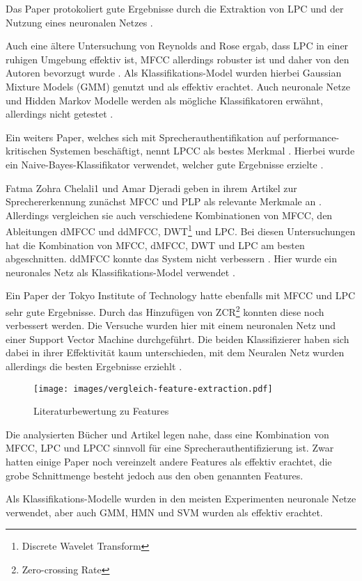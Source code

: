 Das Paper  protokoliert gute Ergebnisse durch die Extraktion von \ac{LPC} und der Nutzung eines neuronalen Netzes \autocite[vgl.][S. 9]{kumar_rajeev_multilingual_2009}.

Auch eine ältere Untersuchung von Reynolds and Rose ergab, dass \ac{LPC} in einer ruhigen Umgebung effektiv ist, \ac{MFCC} allerdings robuster ist und daher von den Autoren bevorzugt wurde \autocite[vgl.][S. 2f]{reynolds_robust_1995}.
Als Klassifikations-Model wurden hierbei Gaussian Mixture Models (GMM) genutzt und als effektiv erachtet.
Auch neuronale Netze und Hidden Markov Modelle werden als mögliche Klassifikatoren erwähnt, allerdings nicht getestet \autocite[vgl.][S. 2f, 11]{reynolds_robust_1995}.

Ein weiters Paper, welches sich mit Sprecherauthentifikation auf performance-kritischen Systemen beschäftigt, nennt \ac{LPCC} als bestes Merkmal \autocite[vgl.][S. 7]{thullier_text-independent_2017}.
Hierbei wurde ein Naive-Bayes-Klassifikator verwendet, welcher gute Ergebnisse erzielte \autocite[vgl.][S. 18f]{thullier_text-independent_2017}.

Fatma Zohra Chelali1 und Amar Djeradi geben in ihrem Artikel zur Sprechererkennung zunächst \ac{MFCC} und PLP als relevante Merkmale an \autocite[vgl.][S. 276]{chelali_text_2017}.
Allerdings vergleichen sie auch verschiedene Kombinationen von \ac{MFCC}, den Ableitungen \ac{dMFCC} und \ac{ddMFCC}, DWT\footnote{Discrete Wavelet Transform} und \ac{LPC}.
Bei diesen Untersuchungen hat die Kombination von \ac{MFCC}, \ac{dMFCC}, DWT und \ac{LPC} am besten abgeschnitten.
\ac{ddMFCC} konnte das System nicht verbessern \autocite[vgl.][S. 276, 739]{chelali_text_2017}.
Hier wurde ein neuronales Netz als Klassifikations-Model verwendet \autocite[vgl.][S. 735]{chelali_text_2017}.

Ein Paper der Tokyo Institute of Technology hatte ebenfalls mit \ac{MFCC} und \ac{LPC} sehr gute Ergebnisse.
Durch das Hinzufügen von ZCR\footnote{Zero-crossing Rate} konnten diese noch verbessert werden.
Die Versuche wurden hier mit einem neuronalen Netz und einer Support Vector Machine durchgeführt.
Die beiden Klassifizierer haben sich dabei in ihrer Effektivität kaum unterschieden, mit dem Neuralen Netz wurden allerdings die besten Ergebnisse erziehlt \autocite[vgl.][S. 4]{neha_chauhan_2019_2019}.

\begin{figure}[H]
    \centering
    \texttt{[image: images/vergleich-feature-extraction.pdf]}
    \caption{Literaturbewertung zu Features}
    \label{fig:vergleichFeatureExtraction}
\end{figure}

Die analysierten Bücher und Artikel legen nahe, dass eine Kombination von \ac{MFCC}, \ac{LPC} und \ac{LPCC} sinnvoll für eine Sprecherauthentifizierung ist.
Zwar hatten einige Paper noch vereinzelt andere Features als effektiv erachtet, die grobe Schnittmenge besteht jedoch aus den oben genannten Features.

Als Klassifikations-Modelle wurden in den meisten Experimenten neuronale Netze verwendet, aber auch GMM, HMN und SVM wurden als effektiv erachtet.

\textauthor{\vJB}{}{}